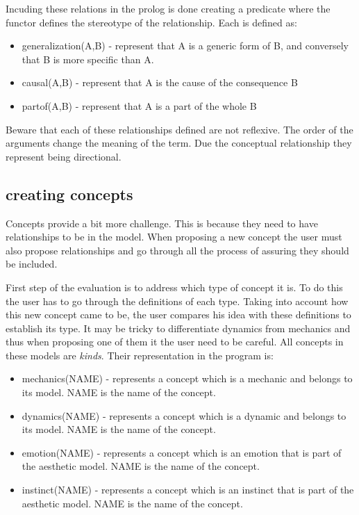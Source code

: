 Incuding these relations in the prolog is done creating a predicate where the functor defines the stereotype of the relationship. Each is defined as:
\begin{itemize}
    \item generalization(A,B) - represent that A is a generic form of B, and conversely that B is more specific than A. 
    \item causal(A,B) - represent that A is the cause of the consequence B
    \item partof(A,B) - represent that A is a part of the whole B
\end{itemize}

Beware that each of these relationships defined are not reflexive. The order of the arguments change the meaning of the term. Due the conceptual relationship they represent being directional.

\subsection{creating concepts}

Concepts provide a bit more challenge. This is because they need to have relationships to be in the model. When proposing a new concept the user must also propose relationships and go through all the process of assuring they should be included.

First step of the evaluation is to address which type of concept it is. To do this the user has to go through the definitions of each type. Taking into account how this new concept came to be, the user compares his idea with these definitions to establish its type. It may be tricky to differentiate dynamics from mechanics and thus when proposing one of them it the user need to be careful. All concepts in these models are \textit{kinds}. Their representation in the program is:
\begin{itemize}
    \item mechanics(NAME) - represents a concept which is a mechanic and belongs to its model. NAME is the name of the concept.
    \item dynamics(NAME) - represents a concept which is a dynamic and belongs to its model. NAME is the name of the concept.
    \item emotion(NAME) - represents a concept which is an emotion that is part of the aesthetic model. NAME is the name of the concept.
    \item instinct(NAME) - represents a concept which is an instinct that is part of the aesthetic model. NAME is the name of the concept.
\end{itemize}

